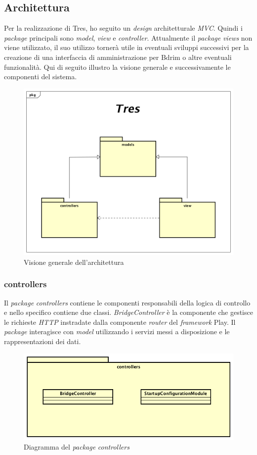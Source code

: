 \subsection{Architettura}
Per la realizzazione di Tres, ho seguito un \emph{design} architetturale \emph{MVC}. Quindi i \emph{package} principali sono \emph{model}, \emph{view} e \emph{controller}. Attualmente il \emph{package} \emph{views} non viene utilizzato, il suo utilizzo tornerà utile in eventuali sviluppi successivi per la creazione di una interfaccia di amministrazione per Bdrim o altre eventuali funzionalità. Qui di seguito illustro la visione generale e successivamente le componenti del sistema.  
\begin{figure}[h]
\centering
\includegraphics[scale=0.35]{immagini/architetturamvc}
\caption{Visione generale dell'architettura}
\label{fig:arch-gen}
\end{figure}
\newpage
\subsubsection{controllers}%
Il \emph{package} \emph{controllers} contiene le componenti responsabili della logica di controllo e nello specifico contiene due classi. \emph{BridgeController} è la componente che gestisce le richieste \emph{HTTP} instradate dalla componente \emph{router} del \emph{framework} Play. Il \emph{package} interagisce con \emph{model} utilizzando i servizi messi a disposizione e le rappresentazioni dei dati.
\begin{figure}[h]
\centering
\includegraphics[scale=0.35]{immagini/controllers}
\caption{Diagramma del \emph{package} \emph{controllers}}
\label{fig:pack-controller}
\end{figure}
